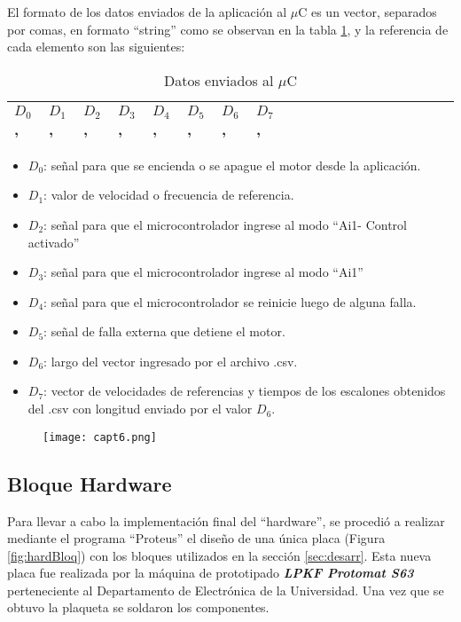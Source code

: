 \begin{enumerate}
El formato de los datos enviados de la aplicación al $\mu$C es un vector, separados por comas, en formato “string” como se observan en la tabla \ref{tab:Datosenviados}, y la referencia de cada elemento son las siguientes:

\begin{table}[H]
	\centering
	\begin{tabular}{|l|l|l|l|l|l|l|l|l|l|l|l|l|l|l|l|l|l|l|l|}
		\hline
			$D_0$ , & $D_1$ , & $D_2$ , & $D_3$ , & $D_4$ , & $D_5$ , & $D_6$ ,  & $D_7$ , \\ \hline
	\end{tabular}
\caption{Datos enviados al $\mu$C}
\label{tab:Datosenviados}
\end{table}

\begin{itemize}
\item $D_0$: señal para que se encienda o se apague el motor desde la aplicación.
\item $D_1$: valor de velocidad o frecuencia de referencia.
\item $D_2$: señal para que el microcontrolador ingrese al modo “Ai1- Control activado”
\item $D_3$: señal para que el microcontrolador ingrese al modo “Ai1”
\item $D_4$: señal para que el microcontrolador se reinicie luego de alguna falla.
\item $D_5$: señal de falla externa que detiene el motor.
\item $D_6$: largo del vector ingresado por el archivo .csv.
\item $D_7$: vector de velocidades de referencias y tiempos de los escalones obtenidos del .csv con longitud enviado por el valor $D_6$.
\end{itemize}	

\end{enumerate}
\begin{figure}[H]
	\centering
	\texttt{[image: capt6.png]}
	\label{fig:capt6}
\end{figure}

\subsection{Bloque Hardware} \label{sec:hard}

Para llevar a cabo la implementación final del “hardware”, se procedió a realizar mediante el programa “Proteus” el diseño de una única placa (Figura \ref{fig:hardBloq}) con los bloques utilizados en la sección \ref{sec:desarr}. Esta nueva placa fue realizada por la máquina de prototipado \textbf{\textit{LPKF Protomat S63}} perteneciente al Departamento de Electrónica de la Universidad. Una vez que se obtuvo la plaqueta se soldaron los componentes.  

